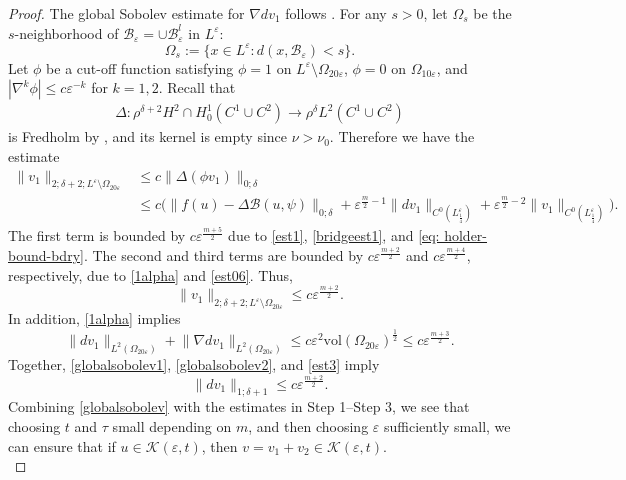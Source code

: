 \documentclass[11pt]{amsart}
\theoremstyle{definition}
\theoremstyle{remark}
\newcommand{\vol}{\mathrm{vol}}
\begin{document}
\begin{proof}
    The global Sobolev estimate for $\nabla dv_1$ follows \cite[Lemma 4.3]{Sm93}. For any $s > 0$, let $\Omega_s$ be the $s$-neighborhood of $\mathscr{B}_\varepsilon = \cup \mathscr{B}_{\varepsilon}^l$ in $L^\varepsilon$:
\[\Omega_s := \{x \in L^\varepsilon: d(x,\mathscr{B}_\varepsilon) < s\}.\]
Let $\phi$ be a cut-off function satisfying $\phi = 1$ on $L^\varepsilon \setminus \Omega_{20\varepsilon}$, $\phi = 0$ on $\Omega_{10\varepsilon}$, and $|\nabla^k\phi|\leq c\varepsilon^{-k}$ for $k = 1,2$.
Recall that
\begin{align*}
    \Delta: \rho^{\delta+2} H^2\cap H^1_0(C^1\cup C^2)\to \rho^{\delta} L^2(C^1\cup C^2)
\end{align*}
is Fredholm by \cite[Theorem 2.1]{Sm93}, and its kernel is empty since $\nu>\nu_0$. Therefore we have the estimate
\begin{align*}
    \|v_1\|_{2;\delta+2; L^\varepsilon \setminus \Omega_{20\varepsilon}} &\leq c\|\Delta(\phi v_1)\|_{0;\delta } \\
    &\leq c \big(\|f(u)-\Delta\mathcal{B}(u,\psi)\|_{0;\delta} + \varepsilon^{\frac{m}{2}-1}\|dv_1\|_{C^0(L_{\frac{1}{4}}^\varepsilon)} + \varepsilon^{\frac{m}{2}-2}\|v_1\|_{C^0(L_{\frac{1}{4}}^\varepsilon)}\big).
\end{align*}
The first term is bounded by $c \varepsilon^{\frac{m+5}{2}}$ due to \eqref{est1}, \eqref{bridgeest1}, and \eqref{eq: holder-bound-bdry}. The second and third terms are bounded by $c\varepsilon^{\frac{m+2}{2}}$ and $c\varepsilon^{\frac{m+4}{2}}$, respectively, due to \eqref{1alpha} and \eqref{est06}. Thus,
\begin{equation}
     \|v_1\|_{2;\delta+2; L^\varepsilon \setminus \Omega_{20\varepsilon}} \leq c \varepsilon^{\frac{m+2}{2}}. \label{globalsobolev1}
\end{equation}
In addition, \eqref{1alpha} implies 
\begin{equation}
\lVert dv_1\rVert_{L^2(\Omega_{20\varepsilon})}+\lVert \nabla dv_1\rVert_{L^2(\Omega_{20\varepsilon})}\leq  c\varepsilon^2\vol(\Omega_{20\varepsilon})^{\frac{1}{2}} \leq c\varepsilon^{\frac{m+3}{2}}. \label{globalsobolev2}
\end{equation}
Together, \eqref{globalsobolev1}, \eqref{globalsobolev2}, and \eqref{est3} imply
\begin{equation}
    \|dv_1\|_{1;\delta+1} \leq c \varepsilon^{\frac{m+2}{2}}. \label{globalsobolev}
\end{equation}
Combining \eqref{globalsobolev} with the estimates in Step 1--Step 3, we see that choosing $t$ and $\tau$ small depending on $m$, and then choosing $\varepsilon$ sufficiently small, we can ensure that if $u\in \mathscr{K}(\varepsilon,t)$, then $v = v_1 + v_2 \in \mathscr{K}(\varepsilon,t)$.\\


\end{proof}
\end{document}
